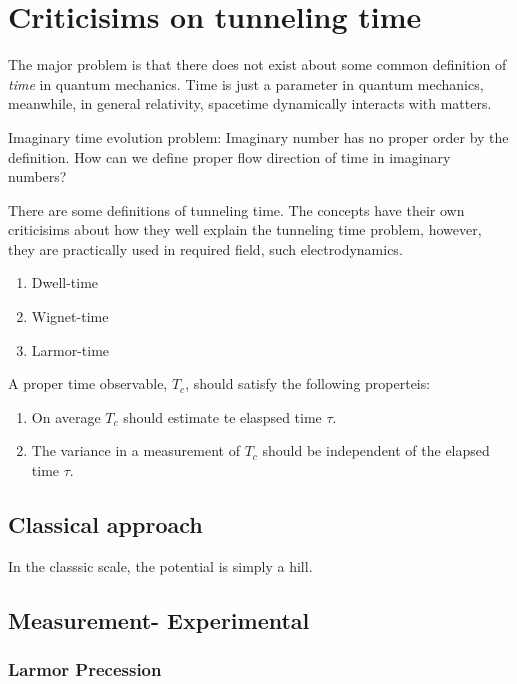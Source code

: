 \section{Criticisims on tunneling time}

The major problem is that there does not exist about some common definition of \textit{time} in quantum mechanics.
Time is just a parameter in quantum mechanics, meanwhile, in general relativity, spacetime dynamically interacts with matters.  

Imaginary time evolution problem: Imaginary number has no proper order by the definition. 
How can we define proper flow direction of time in imaginary numbers?

There are some definitions of tunneling time.
The concepts have their own criticisims about how they well explain the tunneling time problem, 
however, they are practically used in required field, such electrodynamics.

\begin{enumerate}
    \item Dwell-time
    \item Wignet-time
    \item Larmor-time
\end{enumerate}

A proper time observable, $T_c$, should satisfy the following properteis:

\begin{enumerate}
    \item On average $T_c$ should estimate te elaspsed time $\tau$.
    \item The variance in a measurement of $T_c$ should be independent of the elapsed time $\tau$.
\end{enumerate}

\subsection{Classical approach}

In the classsic scale, the potential is simply a hill. 

\subsection{Measurement- Experimental}

\subsubsection{Larmor Precession}

